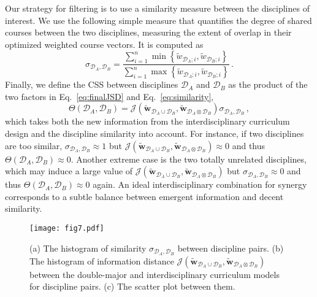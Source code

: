 \documentclass{bmcart}
\begin{document}
Our strategy for filtering is to use a similarity measure between the disciplines of interest. 
We use the following simple measure that quantifies the degree of shared courses between the two disciplines, measuring the extent of overlap in their optimized weighted course vectors. It is computed as
\begin{equation}
\sigma_{\mathcal{D}_A,\mathcal{D}_B} = \frac{\displaystyle \sum_{i=1}^n \min \left\{ \tilde{w}_{\mathcal{D}_A;i}, \tilde{w}_{\mathcal{D}_B;i} \right\}}{\displaystyle \sum_{i=1}^n \max \left\{ \tilde{w}_{\mathcal{D}_A;i}, \tilde{w}_{\mathcal{D}_B;i} \right\}} \,.
\label{eq:similarity}
\end{equation}
Finally, we define the CSS between disciplines $\mathcal{D}_A$ and $\mathcal{D}_B$ as the product of the two factors in Eq.~\eqref{eq:finalJSD} and Eq.~\eqref{eq:similarity},
\begin{equation}
\Theta \left( \mathcal{D}_A,\mathcal{D}_B \right) = \mathcal{J}\left(\tilde{\mathbf{w}}_{\mathcal{D}_A \cup \mathcal{D}_B},\tilde{\mathbf{w}}_{\mathcal{D}_A \otimes \mathcal{D}_B} \right) \sigma_{\mathcal{D}_A,\mathcal{D}_B} \,,
\label{eq:CSS}
\end{equation}
which takes both the new information from the interdisciplinary curriculum design and the discipline similarity into account. For instance, if two disciplines are too similar, $\sigma_{\mathcal{D}_A,\mathcal{D}_B} \approx 1$ but  $\mathcal{J}\left(\tilde{\mathbf{w}}_{\mathcal{D}_A \cup \mathcal{D}_B},\tilde{\mathbf{w}}_{\mathcal{D}_A \otimes \mathcal{D}_B} \right) \approx 0$ and thus $\Theta \left( \mathcal{D}_A,\mathcal{D}_B \right) \approx 0$. Another extreme case is the two totally unrelated disciplines, which may induce a large value of $\mathcal{J}\left(\tilde{\mathbf{w}}_{\mathcal{D}_A \cup \mathcal{D}_B},\tilde{\mathbf{w}}_{\mathcal{D}_A \otimes \mathcal{D}_B} \right)$ but $\sigma_{\mathcal{D}_A,\mathcal{D}_B} \approx 0$ and thus $\Theta \left( \mathcal{D}_A,\mathcal{D}_B \right) \approx 0$ again. An ideal interdisciplinary combination for synergy corresponds to a subtle balance between emergent information and decent similarity. 

\begin{figure}
\centering
\texttt{[image: fig7.pdf]} 
\caption{(a) The histogram of similarity $\sigma_{\mathcal{D}_A,\mathcal{D}_B}$ between discipline pairs. 
(b) The histogram of information distance $\mathcal{J}\left(\tilde{\mathbf{w}}_{\mathcal{D}_A \cup \mathcal{D}_B},\tilde{\mathbf{w}}_{\mathcal{D}_A \otimes \mathcal{D}_B} \right)$ between the double-major and interdisciplinary curriculum models for discipline pairs. 
(c) The scatter plot between them. 
}
\label{figure: histogram and scatter}
\end{figure}
\end{document}
